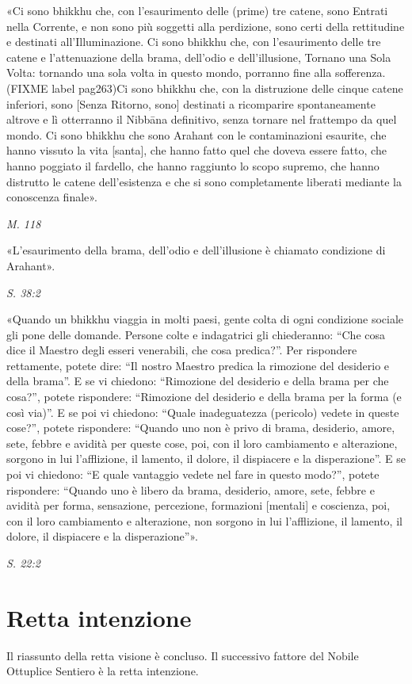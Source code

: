 «Ci sono bhikkhu che, con l’esaurimento delle (prime) tre catene, sono
Entrati nella Corrente, e non sono più soggetti alla perdizione, sono
certi della rettitudine e destinati all’Illuminazione. Ci sono bhikkhu
che, con l’esaurimento delle tre catene e l’attenuazione della brama,
dell’odio e dell’illusione, Tornano una Sola Volta: tornando una sola
volta in questo mondo, porranno fine alla sofferenza. (FIXME label pag263)Ci sono bhikkhu
che, con la distruzione delle cinque catene inferiori, sono [Senza
Ritorno, sono] destinati a ricomparire spontaneamente altrove e lì
otterranno il Nibbāna definitivo, senza tornare nel frattempo da quel
mondo. Ci sono bhikkhu che sono Arahant con le contaminazioni esaurite,
che hanno vissuto la vita [santa], che hanno fatto quel che doveva
essere fatto, che hanno poggiato il fardello, che hanno raggiunto lo
scopo supremo, che hanno distrutto le catene dell’esistenza e che si
sono completamente liberati mediante la conoscenza finale».


\emph{M. 118}


«L’esaurimento della brama, dell’odio e dell’illusione è chiamato
condizione di Arahant».


\emph{S. 38:2}


«Quando un bhikkhu viaggia in molti paesi, gente colta di ogni
condizione sociale gli pone delle domande. Persone colte e indagatrici
gli chiederanno: “Che cosa dice il Maestro degli esseri venerabili, che
cosa predica?”. Per rispondere rettamente, potete dire: “Il nostro
Maestro predica la rimozione del desiderio e della brama”. E se vi
chiedono: “Rimozione del desiderio e della brama per che cosa?”, potete
rispondere: “Rimozione del desiderio e della brama per la forma (e così
via)”. E se poi vi chiedono: “Quale inadeguatezza (pericolo) vedete in
queste cose?”, potete rispondere: “Quando uno non è privo di brama,
desiderio, amore, sete, febbre e avidità per queste cose, poi, con il
loro cambiamento e alterazione, sorgono in lui l’afflizione, il lamento,
il dolore, il dispiacere e la disperazione”. E se poi vi chiedono: “E
quale vantaggio vedete nel fare in questo modo?”, potete rispondere:
“Quando uno è libero da brama, desiderio, amore, sete, febbre e avidità
per forma, sensazione, percezione, formazioni [mentali] e coscienza,
poi, con il loro cambiamento e alterazione, non sorgono in lui
l’afflizione, il lamento, il dolore, il dispiacere e la disperazione”».


\emph{S. 22:2}


\hypertarget{x-retta-intenzione}{\section*{Retta intenzione}}
 Il riassunto della retta visione è concluso. Il
successivo fattore del Nobile Ottuplice Sentiero è la retta intenzione.


